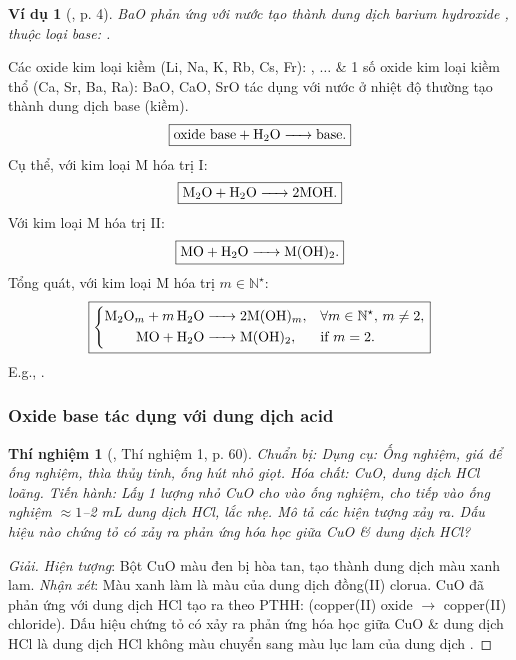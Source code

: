 \documentclass{article}
\newtheorem{thinghiem}{Thí nghiệm}
\newtheorem{vidu}{Ví dụ}
\begin{document}
\begin{vidu}[\cite{SGK_Hoa_Hoc_9}, p. 4]
	{\rm BaO} phản ứng với nước tạo thành dung dịch {\rm barium hydroxide }, thuộc loại base: {\rm{}}.
\end{vidu}
Các oxide kim loại kiềm (Li, Na, K, Rb, Cs, Fr): , $\ldots$ \& 1 số oxide kim loại kiềm thổ (Ca, Sr, Ba, Ra): BaO, CaO, SrO tác dụng với nước ở nhiệt độ thường tạo thành dung dịch base (kiềm).
\begin{align*}
	\boxed{\mbox{oxide base} + \ce{H2O ->} \mbox{base}.}
\end{align*}
Cụ thể, với kim loại M hóa trị I:
\begin{align*}
	\boxed{\ce{M2O + H2O -> $2$MOH}.}
\end{align*}
Với kim loại M hóa trị II:
\begin{align*}
	\boxed{\ce{MO + H2O -> M(OH)2}.}
\end{align*}
Tổng quát, với kim loại M hóa trị $m\in\mathbb{N}^\star$:
\begin{equation*}
	\boxed{\left\{\begin{split}
		\ce{M2O_m + $m$H2O &-> $2$M(OH)_m},&&\forall m\in\mathbb{N}^\star,\,m\ne2,\\
		\ce{MO + H2O &-> M(OH)2},&&\mbox{if } m = 2.
	\end{split}\right.}
\end{equation*}
E.g., .

\subsubsection{Oxide base tác dụng với dung dịch acid}

\begin{thinghiem}[\cite{SGK_KHTN_8_Canh_Dieu}, Thí nghiệm 1, p. 60]
	{\rm Chuẩn bị:} Dụng cụ: Ống nghiệm, giá để ống nghiệm, thìa thủy tinh, ống hút nhỏ giọt. Hóa chất: {\rm CuO}, dung dịch {\rm HCl} loãng. {\rm Tiến hành:} Lấy 1 lượng nhỏ {\rm CuO} cho vào ống nghiệm, cho tiếp vào ống nghiệm $\approx1$--{\rm2 mL} dung dịch {\rm HCl}, lắc nhẹ. Mô tả các hiện tượng xảy ra. Dấu hiệu nào chứng tỏ có xảy ra phản ứng hóa học giữa {\rm CuO} \& dung dịch {\rm HCl}?
\end{thinghiem}

\begin{proof}[Giải]
	\textit{Hiện tượng}: Bột CuO màu đen bị hòa tan, tạo thành dung dịch màu xanh lam. \textit{Nhận xét}: Màu xanh làm là màu của dung dịch đồng(II) clorua. CuO đã phản ứng với dung dịch HCl tạo ra  theo PTHH:  (copper(II) oxide $\to$ copper(II) chloride). Dấu hiệu chứng tỏ có xảy ra phản ứng hóa học giữa CuO \& dung dịch HCl là dung dịch HCl không màu chuyển sang màu lục lam của dung dịch .
\end{proof}
\end{document}

